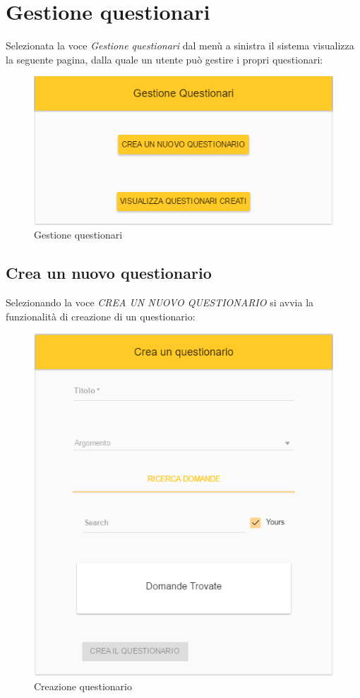 \newpage
\section{Gestione questionari}
Selezionata la voce \textit{Gestione questionari} dal menù a sinistra il sistema visualizza la seguente pagina, dalla quale un utente può gestire i propri questionari:

\label{GestioneQuestionari}
\begin{figure}[ht]
	\centering
	\includegraphics[scale=0.55]{img/gestione_questionari.png}
	\caption{Gestione questionari}
\end{figure}
\FloatBarrier

\subsection{Crea un nuovo questionario}
Selezionando la voce \textit{CREA UN NUOVO QUESTIONARIO} si avvia la funzionalità di creazione di un questionario:

\label{CreazioneQuestionari}
\begin{figure}[ht]
	\centering
	\includegraphics[scale=0.55]{img/creazione_questionario.png}
	\caption{Creazione questionario}
\end{figure}
\FloatBarrier

